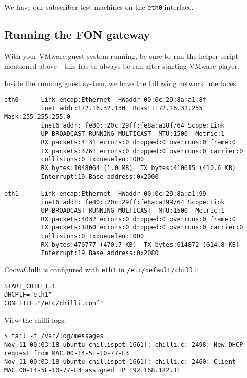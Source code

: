 We have our subscriber test machines on the \texttt{eth0} interface.

\subsection{Running the FON gateway}

With your VMware guest system running, be sure to run the helper
script mentioned above - this has to always be ran after starting
VMware player.

Inside the running guest system, we have the following network
interfaces:

{\footnotesize%
\begin{verbatim}
eth0      Link encap:Ethernet  HWaddr 00:0c:29:8a:a1:8f  
          inet addr:172.16.32.130  Bcast:172.16.32.255  Mask:255.255.255.0
          inet6 addr: fe80::20c:29ff:fe8a:a18f/64 Scope:Link
          UP BROADCAST RUNNING MULTICAST  MTU:1500  Metric:1
          RX packets:4131 errors:0 dropped:0 overruns:0 frame:0
          TX packets:3761 errors:0 dropped:0 overruns:0 carrier:0
          collisions:0 txqueuelen:1000 
          RX bytes:1048064 (1.0 MB)  TX bytes:410615 (410.6 KB)
          Interrupt:19 Base address:0x2000 

eth1      Link encap:Ethernet  HWaddr 00:0c:29:8a:a1:99  
          inet6 addr: fe80::20c:29ff:fe8a:a199/64 Scope:Link
          UP BROADCAST RUNNING MULTICAST  MTU:1500  Metric:1
          RX packets:4032 errors:0 dropped:0 overruns:0 frame:0
          TX packets:1860 errors:0 dropped:0 overruns:0 carrier:0
          collisions:0 txqueuelen:1000 
          RX bytes:470777 (470.7 KB)  TX bytes:614872 (614.8 KB)
          Interrupt:19 Base address:0x2080 
\end{verbatim}%
}

CoovaChilli is configured with \texttt{eth1} in \texttt{/etc/default/chilli}:

{\footnotesize%
\begin{verbatim}
START_CHILLI=1
DHCPIF="eth1"
CONFFILE="/etc/chilli.conf"
\end{verbatim}%
}

View the chilli logs:

{\footnotesize%
\begin{verbatim}
$ tail -f /var/log/messages 
Nov 11 00:03:18 ubuntu chillispot[1661]: chilli.c: 2498: New DHCP request from MAC=00-14-5E-10-77-F3
Nov 11 00:03:18 ubuntu chillispot[1661]: chilli.c: 2460: Client MAC=00-14-5E-10-77-F3 assigned IP 192.168.182.11
\end{verbatim}%
}
